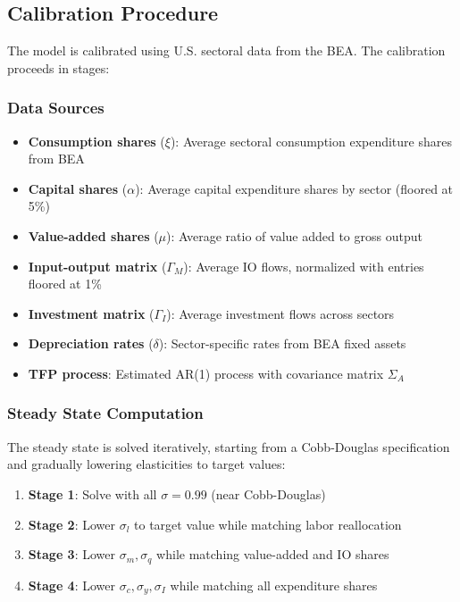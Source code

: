 \documentclass[11pt]{article}
\begin{document}
\subsection{Calibration Procedure}

The model is calibrated using U.S. sectoral data from the BEA. The calibration proceeds in stages:

\subsubsection{Data Sources}
\begin{itemize}
    \item \textbf{Consumption shares} ($\xi$): Average sectoral consumption expenditure shares from BEA
    \item \textbf{Capital shares} ($\alpha$): Average capital expenditure shares by sector (floored at 5\%)
    \item \textbf{Value-added shares} ($\mu$): Average ratio of value added to gross output
    \item \textbf{Input-output matrix} ($\Gamma_M$): Average IO flows, normalized with entries floored at 1\%
    \item \textbf{Investment matrix} ($\Gamma_I$): Average investment flows across sectors
    \item \textbf{Depreciation rates} ($\delta$): Sector-specific rates from BEA fixed assets
    \item \textbf{TFP process}: Estimated AR(1) process with covariance matrix $\Sigma_A$
\end{itemize}

\subsubsection{Steady State Computation}

The steady state is solved iteratively, starting from a Cobb-Douglas specification and gradually lowering elasticities to target values:

\begin{enumerate}
    \item \textbf{Stage 1}: Solve with all $\sigma = 0.99$ (near Cobb-Douglas)
    \item \textbf{Stage 2}: Lower $\sigma_l$ to target value while matching labor reallocation
    \item \textbf{Stage 3}: Lower $\sigma_m, \sigma_q$ while matching value-added and IO shares
    \item \textbf{Stage 4}: Lower $\sigma_c, \sigma_y, \sigma_I$ while matching all expenditure shares
\end{enumerate}
\end{document}
